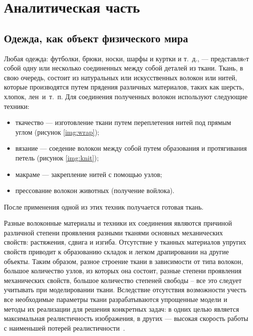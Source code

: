 \chapter{Аналитическая часть}

\section{Одежда, как объект физического мира}

Любая одежда: футболки, брюки, носки, шарфы и куртки и т.~д., --- представляeт
собой одну или несколько соединенных между собой деталей из ткани. Ткань, в свою
очередь, состоит из натуральных или искусственных волокон или нитей, которые
производятся путем прядения различных материалов, таких как шерсть, хлопок,
лен~и~т.~п. Для соединения полученных волокон используют следующие техники:
\begin{itemize}[left=\parindent]
    \item ткачество --- изготовление ткани путем переплетения нитей под прямым
        углом (рисунок \ref{img:wrap});
    \item вязание --- соедение волокон между собой путем образования и
        протягивания петель (рисунок \ref{img:knit});
    \item макраме --- закрепление нитей с помощью узлов;
    \item прессование волокон животных (получение войлока).
\end{itemize}
После применения одной из этих техник получается готовая ткань.


Разные волоконные материалы и техники их соединения являются причиной различной
степени проявления разными тканями основных механических свойств: растяжения,
сдвига и изгиба. Отсутствие у тканных материалов упругих свойств приводит к
образованию складок и легком драпировании на другие объекты. Таким образом,
разное строение ткани в зависимости от типа волокон, большое количество узлов,
из которых она состоит, разные степени проявления механических свойств, большое
количество степеней свободы -- все это следует учитывать при моделировании
ткани. Вследствие отсутствия возможности учесть все необходимые параметры ткани
разрабатываются упрощенные модели и методы их реализации для решения конкретных
задач: в одних целью является максимальная реалистичность изображения, в других
--- высокая скорость работы с наименьшей потерей реалистичности~\cite{bib11}.

